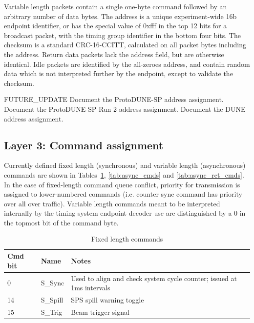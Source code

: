 \documentclass[a4paper,11pt]{article}
\begin{document}
Variable length packets contain a single one-byte command followed by an arbitrary number of data bytes. The address is a unique experiment-wide 16b endpoint identifier, or has the special value of 0xfff in the top 12 bits for a broadcast packet, with the timing group identifier in the bottom four bits. The checksum is a standard CRC-16-CCITT, calculated on all packet bytes including the address. Return data packets lack the address field, but are otherwise identical. Idle packets are identified by the all-zeroes address, and contain random data which is not interpreted further by the endpoint, except to validate the checksum.

{\color{red}FUTURE\_UPDATE} Document the ProtoDUNE-SP address assignment. Document the ProtoDUNE-SP Run 2 address assignment. Document the DUNE address assignment.

\subsection{Layer 3: Command assignment}

Currently defined fixed length (synchronous) and variable length (asynchronous) commands are shown in Tables~\ref{tab:sync_cmds}, \ref{tab:async_cmds} and \ref{tab:async_ret_cmds}. In the case of fixed-length command queue conflict, priority for transmission is assigned to lower-numbered commands (i.e. counter sync command has priority over all over traffic). Variable length commands meant to be interpreted internally by the timing system endpoint decoder use are distinguished by a 0 in the topmost bit of the command byte.

\begin{table}[h!]
  \centering
  \begin{tabular}{@{}llp{9cm}@{}} \toprule
    Cmd bit & Name & Notes\\ \midrule
    0 & S\_Sync & Used to align and check system cycle counter; issued at 1ms intervals \\
    14 & S\_Spill & SPS spill warning toggle \\
    15 & S\_Trig & Beam trigger signal \\ \bottomrule
  \end{tabular}
  \caption{Fixed length commands}
  \label{tab:sync_cmds}
\end{table}
\end{document}
